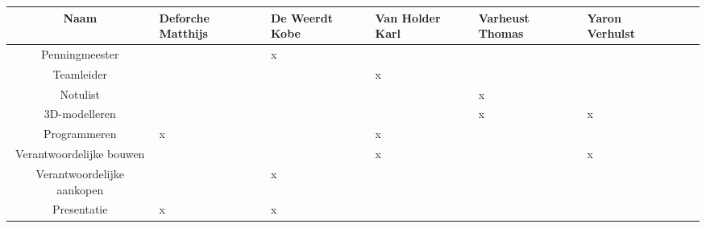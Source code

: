 \documentclass[landscape, 12pt]{article}
\begin{document}
	
	
	
	
	
	
	
	\begin{tabular}{|c||l|l|l|l|l|l|l|}
		\hline
		Naam & Deforche Matthijs & De Weerdt Kobe & Van Holder Karl & Varheust Thomas & Yaron Verhulst  \\ \hline \hline
		
		Penningmeester             &  &x &  &  &  \\ \hline
		Teamleider                 &  &  &x &  &  \\ \hline      
		Notulist                   &  &  &  &x &  \\ \hline
		3D-modelleren              &  &  &  &x &x \\ \hline
		Programmeren               &x &  &x &  &  \\ \hline
		Verantwoordelijke bouwen   &  &  &x &  &x \\ \hline
		Verantwoordelijke aankopen &  &x &  &  &  \\ \hline
		Presentatie                &x &x &  &  &  \\ \hline
	
		
	\end{tabular}
	
	
	
	
	
	
	
	
\end{document}
